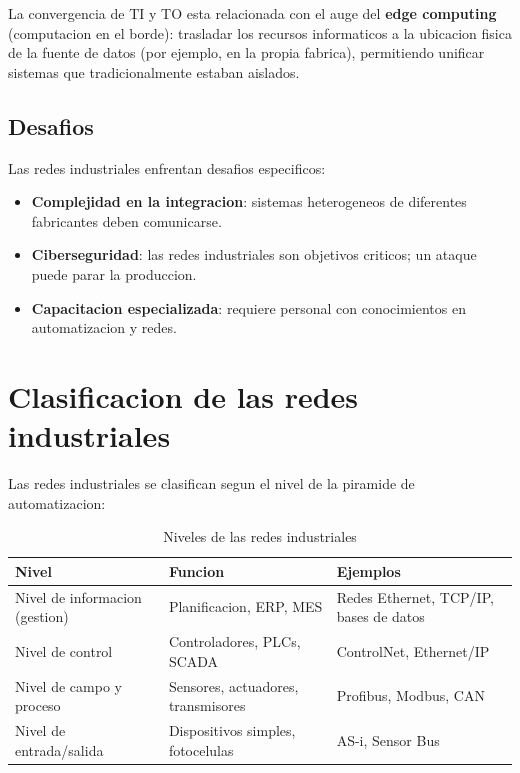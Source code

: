 La convergencia de TI y TO esta relacionada con el auge del \textbf{edge computing}
(computacion en el borde): trasladar los recursos informaticos a la ubicacion
fisica de la fuente de datos (por ejemplo, en la propia fabrica), permitiendo unificar
sistemas que tradicionalmente estaban aislados.

\subsection{Desafios}

Las redes industriales enfrentan desafios especificos:
\begin{itemize}
    \item \textbf{Complejidad en la integracion}: sistemas heterogeneos de diferentes
    fabricantes deben comunicarse.
    \item \textbf{Ciberseguridad}: las redes industriales son objetivos criticos; un ataque
    puede parar la produccion.
    \item \textbf{Capacitacion especializada}: requiere personal con conocimientos en
    automatizacion y redes.
\end{itemize}


\section{Clasificacion de las redes industriales}

Las redes industriales se clasifican segun el nivel de la piramide de automatizacion:

\begin{table}[htbp]
\centering
\small
\caption{Niveles de las redes industriales}
\begin{tabularx}{\textwidth}{@{}l>{\raggedright\arraybackslash}X>{\raggedright\arraybackslash}X@{}}
\toprule
\textbf{Nivel} & \textbf{Funcion} & \textbf{Ejemplos} \\
\midrule
Nivel de informacion (gestion) & Planificacion, ERP, MES & Redes Ethernet, TCP/IP, bases de datos \\
Nivel de control & Controladores, PLCs, SCADA & ControlNet, Ethernet/IP \\
Nivel de campo y proceso & Sensores, actuadores, transmisores & Profibus, Modbus, CAN \\
Nivel de entrada/salida & Dispositivos simples, fotocelulas & AS-i, Sensor Bus \\
\bottomrule
\end{tabularx}
\end{table}

